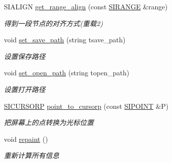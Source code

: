 \begin{DoxyCompactItemize}
\begin{DoxyCompactList}
\end{DoxyCompactList}\item 
S\+I\+A\+L\+I\+GN \hyperlink{class_s_i_t_e_x_t_a53c41b86be047c49946fab50ef79563b}{get\+\_\+range\+\_\+align} (const \hyperlink{struct_s_i_r_a_n_g_e}{S\+I\+R\+A\+N\+GE} \&range)
\begin{DoxyCompactList}\small\item\em 得到一段节点的对齐方式(重载2) \end{DoxyCompactList}\item 
\mbox{\label{class_s_i_t_e_x_t_a150118dc911f012d521f64a54fbc05f5}} 
void \hyperlink{class_s_i_t_e_x_t_a150118dc911f012d521f64a54fbc05f5}{set\+\_\+save\+\_\+path} (string tsave\+\_\+path)
\begin{DoxyCompactList}\small\item\em 设置保存路径 \end{DoxyCompactList}\item 
\mbox{\label{class_s_i_t_e_x_t_aaf81d56b98488470fb9b7eba1f570d8e}} 
void \hyperlink{class_s_i_t_e_x_t_aaf81d56b98488470fb9b7eba1f570d8e}{set\+\_\+open\+\_\+path} (string topen\+\_\+path)
\begin{DoxyCompactList}\small\item\em 设置打开路径 \end{DoxyCompactList}\item 
\mbox{\label{class_s_i_t_e_x_t_a7855275742bfdd1634cdadaae7199c14}} 
\hyperlink{class_s_i_c_h_a_r_n_o_d_e}{S\+I\+C\+U\+R\+S\+O\+RP} \hyperlink{class_s_i_t_e_x_t_a7855275742bfdd1634cdadaae7199c14}{point\+\_\+to\+\_\+cursorp} (const \hyperlink{struct_s_i_p_o_i_n_t}{S\+I\+P\+O\+I\+NT} \&P)
\begin{DoxyCompactList}\small\item\em 把屏幕上的点转换为光标位置 \end{DoxyCompactList}\item 
\mbox{\label{class_s_i_t_e_x_t_a522c51f7d06db3e4797ee004666fa260}} 
void \hyperlink{class_s_i_t_e_x_t_a522c51f7d06db3e4797ee004666fa260}{repaint} ()
\begin{DoxyCompactList}\small\item\em 重新计算所有信息 \end{DoxyCompactList}\item 
\mbox{\label{class_s_i_t_e_x_t_a9555644951be5d9def8c2a8d4843bf4c}} 

\end{DoxyCompactItemize}
